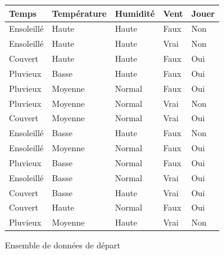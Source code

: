 \documentclass[a4paper, 11pt]{report}
\begin{document}
\begin{figure}[!h]
\begin{center}

\caption{Ensemble de données de départ}
\begin{tabular}{| l | l | l | l | l |}
\hline
\rowcolor{gray!25}
Temps & Température & Humidité & Vent & Jouer \\
\hline
Ensoleillé & Haute & Haute & Faux & \cellcolor{green}Non \\
\hline
Ensoleillé & Haute & Haute & Vrai & \cellcolor{green}Non \\
\hline
Couvert & Haute & Haute & Faux & \cellcolor{yellow}Oui \\
\hline
Pluvieux & Basse & Haute & Faux & \cellcolor{yellow}Oui \\
\hline
Pluvieux & Moyenne & Normal & Faux & \cellcolor{yellow}Oui \\
\hline
Pluvieux & Moyenne & Normal & Vrai &  \cellcolor{green}Non \\
\hline
Couvert & Moyenne & Normal & Vrai &  \cellcolor{yellow}Oui \\
\hline
Ensoleillé & Basse & Haute & Faux &  \cellcolor{green}Non \\
\hline
Ensoleillé & Moyenne & Normal & Faux &  \cellcolor{yellow}Oui \\
\hline
Pluvieux & Basse & Normal & Faux &  \cellcolor{yellow}Oui \\
\hline
Ensoleillé & Basse & Normal & Vrai &  \cellcolor{yellow}Oui \\
\hline
Couvert & Basse & Haute & Vrai &  \cellcolor{yellow}Oui \\
\hline
Couvert & Haute & Normal & Faux &  \cellcolor{yellow}Oui \\
\hline
Pluvieux & Moyenne & Haute & Vrai &  \cellcolor{green}Non \\
\hline
\end{tabular}
\end{center}

\end{figure}
\newpage
\end{document}
